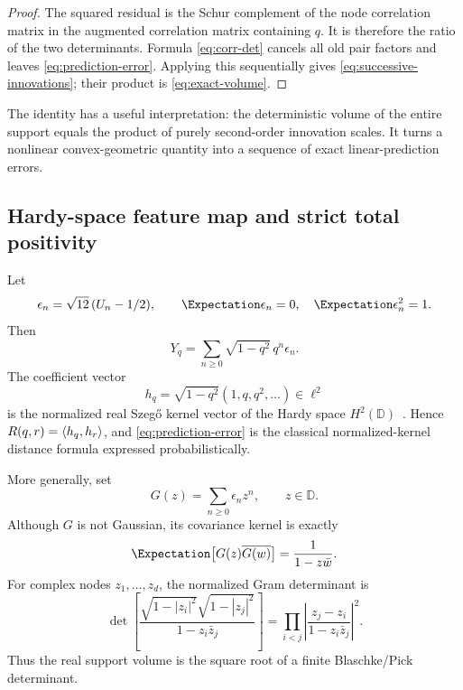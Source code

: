 \documentclass[11pt,a4paper]{article}
\theoremstyle{definition}
\theoremstyle{remark}
\DeclarePairedDelimiter{\ip}{\langle}{\rangle}
\begin{document}
\begin{proof}
The squared residual is the Schur complement of the node correlation matrix in the augmented correlation matrix containing $q$.  It is therefore the ratio of the two determinants.  Formula \eqref{eq:corr-det} cancels all old pair factors and leaves \eqref{eq:prediction-error}.  Applying this sequentially gives \eqref{eq:successive-innovations}; their product is \eqref{eq:exact-volume}.
\end{proof}

The identity has a useful interpretation: the deterministic volume of the entire support equals the product of purely second-order innovation scales.  It turns a nonlinear convex-geometric quantity into a sequence of exact linear-prediction errors.

\subsection{Hardy-space feature map and strict total positivity}

Let
\begin{equation}
  \epsilon_n=\sqrt{12}\,(U_n-1/2),
  \qquad \Expectation\epsilon_n=0,\quad\Expectation\epsilon_n^2=1.
  \label{eq:epsilon}
\end{equation}
Then
\begin{equation}
  Y_q=\sum_{n\ge0}\sqrt{1-q^2}\,q^n\epsilon_n.
  \label{eq:Y-feature}
\end{equation}
The coefficient vector
\begin{equation}
  h_q=\sqrt{1-q^2}(1,q,q^2,\ldots)\in\ell^2
  \label{eq:hardy-feature}
\end{equation}
is the normalized real Szeg\H{o} kernel vector of the Hardy space $H^2(\mathbb D)$~\cite{Duren}.  Hence $R(q,r)=\ip{h_q,h_r}$, and \eqref{eq:prediction-error} is the classical normalized-kernel distance formula expressed probabilistically.

More generally, set
\begin{equation}
  G(z)=\sum_{n\ge0}\epsilon_nz^n,
  \qquad z\in\mathbb D.
  \label{eq:random-analytic-G}
\end{equation}
Although $G$ is not Gaussian, its covariance kernel is exactly
\begin{equation}
  \Expectation\bigl[G(z)\overline{G(w)}\bigr]=\frac1{1-z\bar w}.
  \label{eq:szego-covariance}
\end{equation}
For complex nodes $z_1,\ldots,z_d$, the normalized Gram determinant is
\begin{equation}
  \det\left[
   \frac{\sqrt{1-|z_i|^2}\sqrt{1-|z_j|^2}}
        {1-z_i\bar z_j}
  \right]
  =\prod_{i<j}
    \left|\frac{z_j-z_i}{1-z_i\bar z_j}\right|^2.
  \label{eq:complex-gram-det}
\end{equation}
Thus the real support volume is the square root of a finite Blaschke/Pick determinant.
\end{document}
